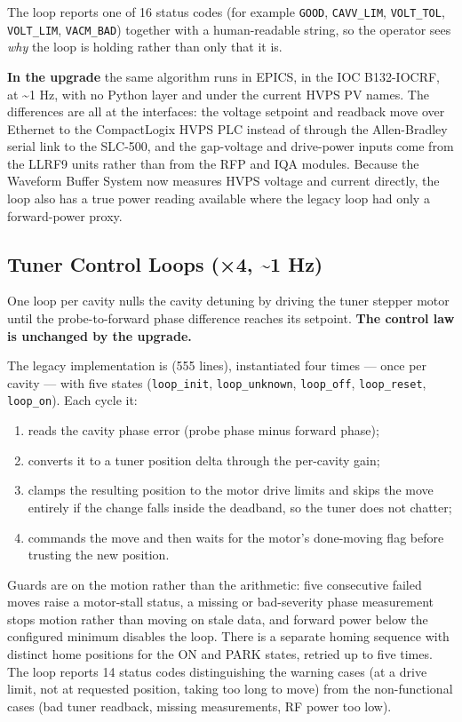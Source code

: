 The loop reports one of 16 status codes (for example \texttt{GOOD}, \texttt{CAVV\_LIM}, \texttt{VOLT\_TOL}, \texttt{VOLT\_LIM}, \texttt{VACM\_BAD}) together with a human-readable string, so the operator sees \emph{why} the loop is holding rather than only that it is.

\textbf{In the upgrade} the same algorithm runs in EPICS, in the IOC \mbox{B132-IOCRF}, at \textasciitilde1 Hz, with no Python layer and under the current HVPS PV names. The differences are all at the interfaces: the voltage setpoint and readback move over Ethernet to the CompactLogix HVPS PLC instead of through the Allen-Bradley serial link to the SLC-500, and the gap-voltage and drive-power inputs come from the LLRF9 units rather than from the RFP and IQA modules. Because the Waveform Buffer System now measures HVPS voltage and current directly, the loop also has a true power reading available where the legacy loop had only a forward-power proxy.

\subsection{Tuner Control Loops (×4, \textasciitilde1 Hz)}\label{tuner-control-loops-4-1-hz}

One loop per cavity nulls the cavity detuning by driving the tuner stepper motor until the probe-to-forward phase difference reaches its setpoint. \textbf{The control law is unchanged by the upgrade.}

The legacy implementation is  (555 lines), instantiated four times --- once per cavity --- with five states (\texttt{loop\_init}, \texttt{loop\_unknown}, \texttt{loop\_off}, \texttt{loop\_reset}, \texttt{loop\_on}). Each cycle it:

\begin{enumerate}
\tightlist
\item
  reads the cavity phase error (probe phase minus forward phase);
\item
  converts it to a tuner position delta through the per-cavity gain;
\item
  clamps the resulting position to the motor drive limits and skips the move entirely if the change falls inside the deadband, so the tuner does not chatter;
\item
  commands the move and then waits for the motor's done-moving flag before trusting the new position.
\end{enumerate}

Guards are on the motion rather than the arithmetic: five consecutive failed moves raise a motor-stall status, a missing or bad-severity phase measurement stops motion rather than moving on stale data, and forward power below the configured minimum disables the loop. There is a separate homing sequence with distinct home positions for the ON and PARK states, retried up to five times. The loop reports 14 status codes distinguishing the warning cases (at a drive limit, not at requested position, taking too long to move) from the non-functional cases (bad tuner readback, missing measurements, RF power too low).

